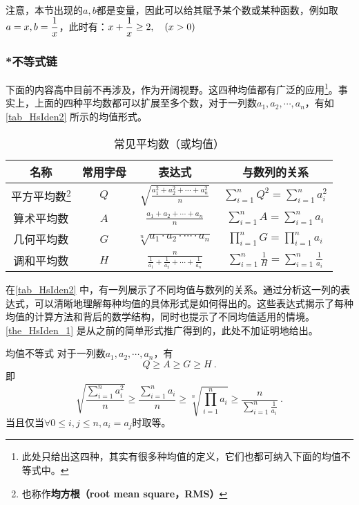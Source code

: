 注意，本节出现的$a,b$都是变量，因此可以给其赋予某个数或某种函数，例如取$\displaystyle a=x,b={1\over x}$，此时有：$\displaystyle x+{1\over x}\geq2,\quad(x>0)$


\subsubsection{*不等式链}

下面的内容高中目前不再涉及，作为开阔视野。这四种均值都有广泛的应用\footnote{此处只给出这四种，其实有很多种均值的定义，它们也都可纳入下面的均值不等式中。}。事实上，上面的四种平均数都可以扩展至多个数，对于一列数$a_1,a_2,\cdots,a_n$，有如\autoref{tab_HsIden2} 所示的均值形式。

\begin{table}[ht]
\centering
\caption{常见平均数（或均值）}\label{tab_HsIden2}
\begin{tabular}{|c|c|c|c|}
\hline 名称 & 常用字母 & 表达式 & 与数列的关系 \\
\hline
平方平均数\footnote{也称作\textbf{均方根（root mean square，RMS）}}&$Q$ & $\displaystyle \sqrt{\frac{a_1^2 + a_2^2 + \cdots + a_n^2}{n}}$ & $\displaystyle \sum_{i=1}^nQ^2= \sum_{i=1}^na_i^2$ \\
\hline
算术平均数&$A$ & $\displaystyle \frac{a_1 + a_2 + \cdots + a_n}{n}$ &$\displaystyle \sum_{i=1}^nA= \sum_{i=1}^n{a_i}$ \\
\hline
几何平均数&$G$ & $\displaystyle \sqrt[n]{a_1 \cdot a_2 \cdot \cdots \cdot a_n}$ &$\displaystyle \prod_{i=1}^nG= \prod_{i=1}^n{a_i}$ \\
\hline
调和平均数&$H$ &  $\displaystyle \frac{n}{\frac{1}{a_1} + \frac{1}{a_2} + \cdots + \frac{1}{a_n}}$ & $\displaystyle \sum_{i=1}^n\frac{1}{H}= \sum_{i=1}^n\frac{1}{a_i}$ \\
\hline
\end{tabular}
\end{table}

在\autoref{tab_HsIden2} 中，有一列展示了不同均值与数列的关系。通过分析这一列的表达式，可以清晰地理解每种均值的具体形式是如何得出的。这些表达式揭示了每种均值的计算方法和背后的数学结构，同时也提示了不同均值适用的情境。\autoref{the_HsIden_1} 是从之前的简单形式推广得到的，此处不加证明地给出。

\begin{theorem}{均值不等式}\label{the_HsIden_1}
对于一列数$a_1,a_2,\cdots,a_n$，有
\begin{equation}
Q\geq A\geq G\geq H~.
\end{equation}
即
\begin{equation}
\displaystyle\sqrt{\frac{\displaystyle\sum_{i=1}^na_i^2}{n}}\geq \frac{\displaystyle\sum_{i=1}^na_i}{n}\geq \sqrt[n]{\prod_{i=1}^na_i}\geq \frac{n}{\displaystyle\sum_{i=1}^n\frac{1}{a_i}}~.
\end{equation}
当且仅当$\forall 0\leq i,j\leq n,a_i=a_j$时取等。
\end{theorem}


